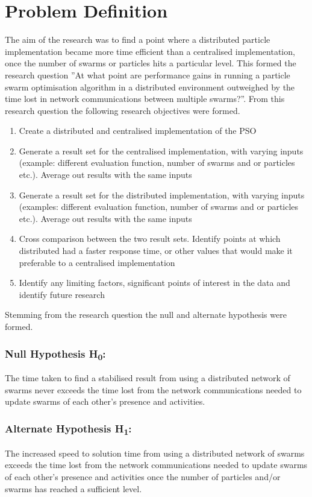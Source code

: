 \documentclass[oneside,12pt]{book}
\begin{document}
\section{Problem Definition}
The aim of the research was to find a point where a distributed particle implementation became more time efficient than a centralised implementation, once the number of swarms or particles hits a particular level. This formed the research question ”At what point are performance gains in running a particle swarm optimisation algorithm in a distributed environment outweighed by the time lost in network communications between multiple swarms?”. From this research question the following research objectives were formed. 
\begin{enumerate}
\item Create a distributed and centralised implementation of the PSO
\item Generate a result set for the centralised implementation, with varying inputs (example: different evaluation function, number of swarms and or particles etc.). Average out results with the same inputs
\item Generate a result set for the distributed implementation, with varying inputs (examples: different evaluation function, number of swarms and or particles etc.). Average out results with the same inputs
\item Cross comparison between the two result sets. Identify points at which distributed had a faster response time, or other values that would make it preferable to a centralised implementation
\item Identify any limiting factors, significant points of interest in the data and identify future research
\end{enumerate}
Stemming from the research question the null and alternate hypothesis were formed. 
\subsubsection{Null Hypothesis H\textsubscript{0}:}
The time taken to find a stabilised result from using a distributed network of swarms never exceeds the time lost from the network communications needed to update swarms of each other's presence and activities.

\subsubsection{Alternate Hypothesis H\textsubscript{1}:}
The increased speed to solution time from using a distributed network of swarms exceeds the time lost from the network communications needed to update swarms of each other's presence and activities once the number of particles and/or swarms has reached a sufficient level.
\end{document}

